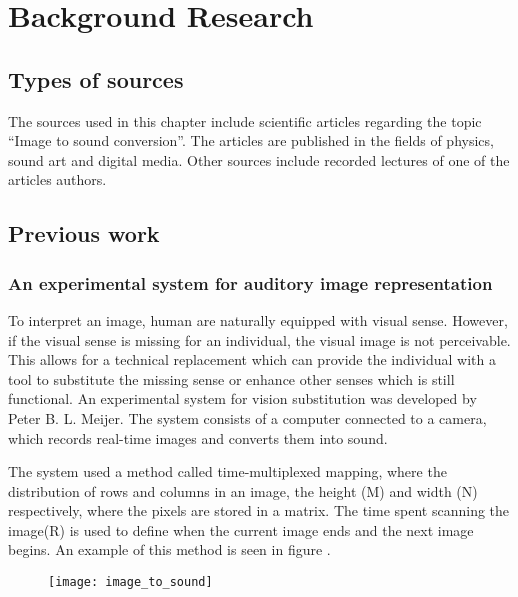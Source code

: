 \chapter{Background Research}\label{ch:bgresearch}



\section{Types of sources}\label{sec:typesofsources} 
The sources used in this chapter include scientific articles regarding the topic “Image to sound conversion”. The articles are published in the fields of physics, sound art and digital media. Other sources include recorded lectures of one of the articles authors.

\section{Previous work}\label{sec:previouswork}

\subsection{An experimental system for auditory image representation}\label{sec:experimentalsystem}

To interpret an image, human are naturally equipped with visual sense. However, if the visual sense is missing for an individual, the visual image is not perceivable. This allows for a technical replacement which can provide the individual with a tool to substitute the missing sense or enhance other senses which is still functional. An experimental system for vision substitution was developed by Peter B. L. Meijer. The system consists of a computer connected to a camera, which records real-time images and converts them into sound. 

The system used a method called time-multiplexed mapping, where the distribution of rows and columns in an image, the height (M) and width (N) respectively, where the pixels are stored in a matrix. The time spent scanning the image(R) is used to define when the current image ends and the next image begins. An example of this method is seen in figure . 

\begin{figure}[!h] 
\centering
\texttt{[image: image\_to\_sound]}
\caption{\label{fig:image_to_sound}}
\end{figure}

